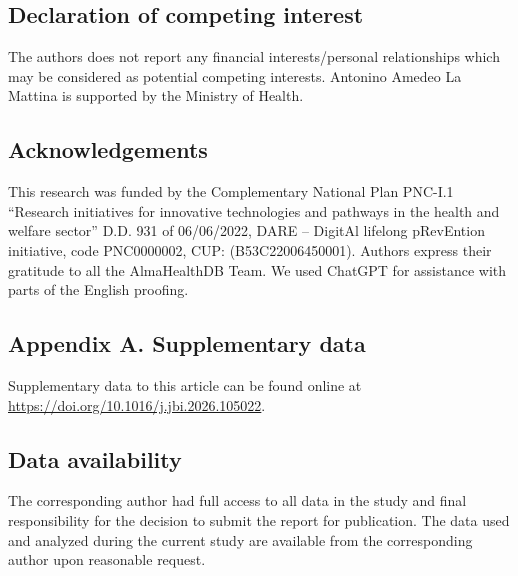 \subsection*{Declaration of competing interest}

The authors does not report any financial interests/personal relationships which may be considered as potential competing interests. Antonino Amedeo La Mattina is supported by the Ministry of Health.

\subsection*{Acknowledgements}

This research was funded by the Complementary National Plan PNC-I.1 ``Research initiatives for innovative technologies and pathways in the health and welfare sector'' D.D. 931 of 06/06/2022, DARE -- DigitAl lifelong pRevEntion initiative, code PNC0000002, CUP: (B53C22006450001). Authors express their gratitude to all the AlmaHealthDB Team. We used ChatGPT for assistance with parts of the English proofing.

\subsection*{Appendix A. Supplementary data}

Supplementary data to this article can be found online at \url{https://doi.org/10.1016/j.jbi.2026.105022}.

\subsection*{Data availability}

The corresponding author had full access to all data in the study and final responsibility for the decision to submit the report for publication. The data used and analyzed during the current study are available from the corresponding author upon reasonable request.

\FloatBarrier
